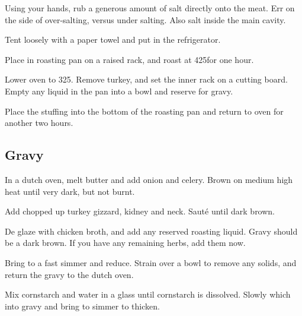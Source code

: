 \begin{recipe}
Using your hands, rub a generous amount of salt directly onto the meat. Err on the side of over-salting, versus under salting. Also salt inside the main cavity.

Tent loosely with a paper towel and put in the refrigerator.

Place in roasting pan on a raised rack, and roast at 425\degree for one hour.

Lower oven to 325\degree. Remove turkey, and set the inner rack on a cutting board. Empty any liquid in the pan into a bowl and reserve for gravy.

Place the stuffing into the bottom of the roasting pan and return to oven for another two hours.

\subsection{Gravy}



In a dutch oven, melt butter and add onion and celery. Brown on medium high heat until very dark, but not burnt.

Add chopped up turkey gizzard, kidney and neck. Sauté until dark brown.


De glaze with chicken broth, and add any reserved roasting liquid. Gravy should be a dark brown. If you have any remaining herbs, add them now.

Bring to a fast simmer and reduce. Strain over a bowl to remove any solids, and return the gravy to the dutch oven.


Mix cornstarch and water in a glass until cornstarch is dissolved. Slowly which into gravy and bring to simmer to thicken.


\end{recipe}
